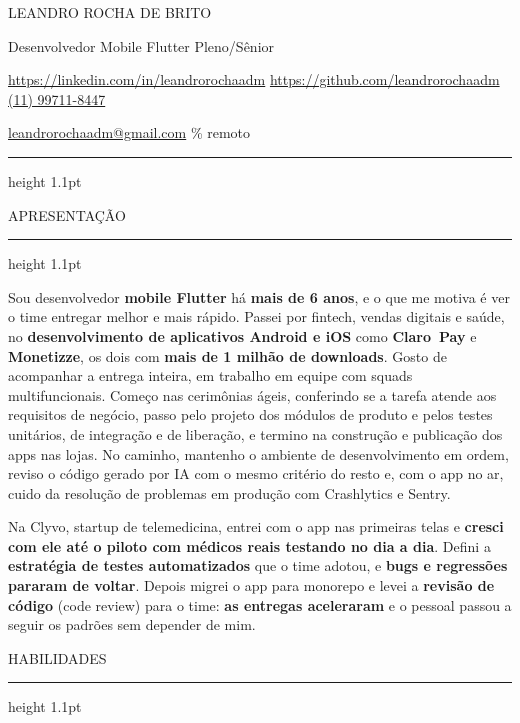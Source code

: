\documentclass[9pt,a4paper]{extarticle}
\newcommand{\sect}[1]{%
  \vspace{0.85em}%
  {\secfont\fontsize{9.5}{11}\selectfont\color{accent}\MakeUppercase{#1}}\par
  \vspace{0.30em}%
  {\color{rule}\hrule height 1.1pt}%
  \vspace{0.75em}%
}
\begin{document}
{\interbold\fontsize{21}{24}\selectfont\color{accent} LEANDRO ROCHA DE BRITO}\par
\vspace{0.20em}
{\fontsize{12}{15}\selectfont\color{ink} Desenvolvedor Mobile Flutter Pleno/Sênior}\par
\vspace{0.60em}
{\fontsize{9.3}{13}\selectfont\color{muted}
\href{https://www.linkedin.com/in/leandrorochaadm}{https://linkedin.com/in/leandrorochaadm} \quad
\href{https://github.com/leandrorochaadm}{https://github.com/leandrorochaadm} \quad
\href{http://wa.me/5511997118447}{(11) 99711-8447}\par
\vspace{0.15em}
\href{mailto:leandrorochaadm@gmail.com}{leandrorochaadm@gmail.com} \% remoto\par
}
\vspace{0.55em}
{\color{rule}\hrule height 1.1pt}

\sect{Apresentação}

Sou desenvolvedor \textbf{mobile Flutter} há \textbf{mais de 6 anos}, e o que me motiva é ver o time entregar melhor e mais rápido. Passei por fintech, vendas digitais e saúde, no \textbf{desenvolvimento de aplicativos Android e iOS} como \textbf{Claro~Pay} e \textbf{Monetizze}, os dois com \textbf{mais de 1 milhão de downloads}. Gosto de acompanhar a entrega inteira, em trabalho em equipe com squads multifuncionais. Começo nas cerimônias ágeis, conferindo se a tarefa atende aos requisitos de negócio, passo pelo projeto dos módulos de produto e pelos testes unitários, de integração e de liberação, e termino na construção e publicação dos apps nas lojas. No caminho, mantenho o ambiente de desenvolvimento em ordem, reviso o código gerado por IA com o mesmo critério do resto e, com o app no ar, cuido da resolução de problemas em produção com Crashlytics e Sentry.

Na Clyvo, startup de telemedicina, entrei com o app nas primeiras telas e \textbf{cresci com ele até o piloto com médicos reais testando no dia a dia}. Defini a \textbf{estratégia de testes automatizados} que o time adotou, e \textbf{bugs e regressões pararam de voltar}. Depois migrei o app para monorepo e levei a \textbf{revisão de código} (code review) para o time: \textbf{as entregas aceleraram} e o pessoal passou a seguir os padrões sem depender de mim.

\sect{Habilidades}
\end{document}
